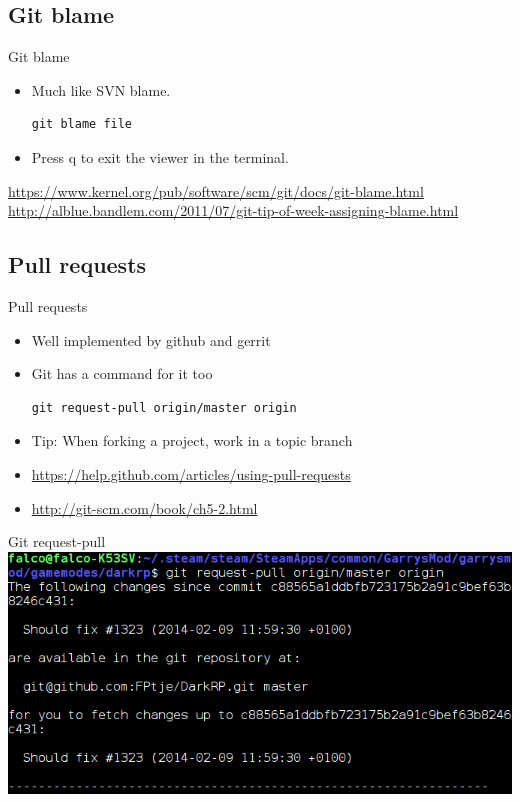 \documentclass[10pt,a4paper]{beamer}
\begin{document}
\subsection{Git blame}
\begin{frame}[fragile]{Git blame}
\begin{itemize}
\item Much like SVN blame.
\begin{verbatim}git blame file\end{verbatim}
\item Press q to exit the viewer in the terminal.
\end{itemize}
\href{https://www.kernel.org/pub/software/scm/git/docs/git-blame.html}{\color{blue}https://www.kernel.org/pub/software/scm/git/docs/git-blame.html}
\href{http://alblue.bandlem.com/2011/07/git-tip-of-week-assigning-blame.html}{\color{blue}http://alblue.bandlem.com/2011/07/git-tip-of-week-assigning-blame.html}

\end{frame}

\subsection{Pull requests}
\begin{frame}[fragile]{Pull requests}
\begin{itemize}
\item Well implemented by github and gerrit
\item Git has a command for it too
\begin{verbatim}git request-pull origin/master origin\end{verbatim}
\item Tip: When forking a project, work in a topic branch
\item \href{https://help.github.com/articles/using-pull-requests}{\color{blue}https://help.github.com/articles/using-pull-requests}
\item \href{http://git-scm.com/book/ch5-2.html}{\color{blue}http://git-scm.com/book/ch5-2.html}
\end{itemize}
\end{frame}

\begin{frame}{Git request-pull}
\includegraphics[width=\linewidth]{gitrequestpull.png}
\end{frame}
\end{document}
